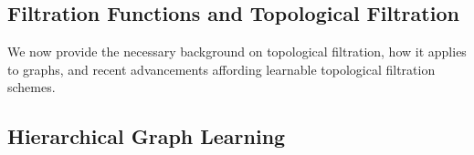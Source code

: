 \iffalse
\subsection{Message Passing}
\label{sSec:message_passing}
\snote{Refer to 'Message Passing All the Way Up by Velckovic et al. for good background on related material}
\snote{refer to topological deep learning message passing architectures paper for background}
\snote{mention Hajij Combintorial Complexes: Bridging the Gap Between Cell Complexes and Hypergraphs}
\fi

\subsection{Filtration Functions and Topological Filtration}
We now provide the necessary background on topological filtration, how it applies to graphs, and recent advancements affording learnable topological filtration schemes. 

\label{sSec:filtration}



\subsection{Hierarchical Graph Learning}
\label{sSec:hierarchical_graph_learining_simplification}

